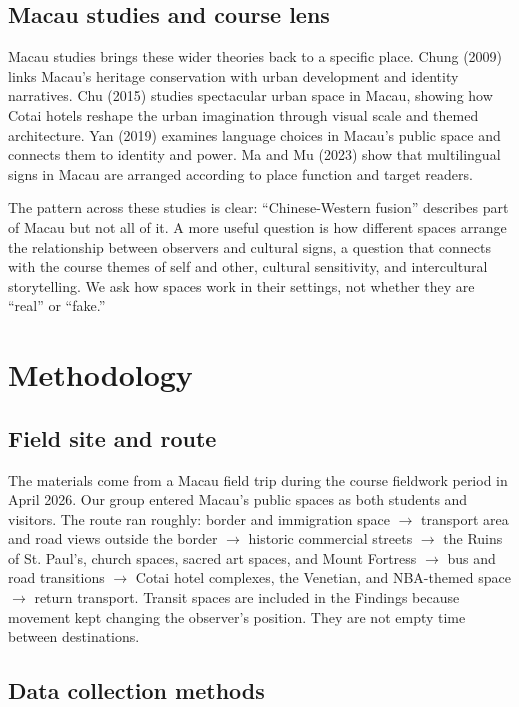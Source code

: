 \documentclass[12pt,a4paper]{article}
\begin{document}
\subsection{Macau studies and course lens}

Macau studies brings these wider theories back to a specific place. Chung (2009) links Macau's heritage conservation with urban development and identity narratives. Chu (2015) studies spectacular urban space in Macau, showing how Cotai hotels reshape the urban imagination through visual scale and themed architecture. Yan (2019) examines language choices in Macau's public space and connects them to identity and power. Ma and Mu (2023) show that multilingual signs in Macau are arranged according to place function and target readers.

The pattern across these studies is clear: ``Chinese-Western fusion'' describes part of Macau but not all of it. A more useful question is how different spaces arrange the relationship between observers and cultural signs, a question that connects with the course themes of self and other, cultural sensitivity, and intercultural storytelling. We ask how spaces work in their settings, not whether they are ``real'' or ``fake.''

\section{Methodology}

\subsection{Field site and route}

The materials come from a Macau field trip during the course fieldwork period in April 2026. Our group entered Macau's public spaces as both students and visitors. The route ran roughly: border and immigration space $\rightarrow$ transport area and road views outside the border $\rightarrow$ historic commercial streets $\rightarrow$ the Ruins of St. Paul's, church spaces, sacred art spaces, and Mount Fortress $\rightarrow$ bus and road transitions $\rightarrow$ Cotai hotel complexes, the Venetian, and NBA-themed space $\rightarrow$ return transport. Transit spaces are included in the Findings because movement kept changing the observer's position. They are not empty time between destinations.

\subsection{Data collection methods}
\end{document}
